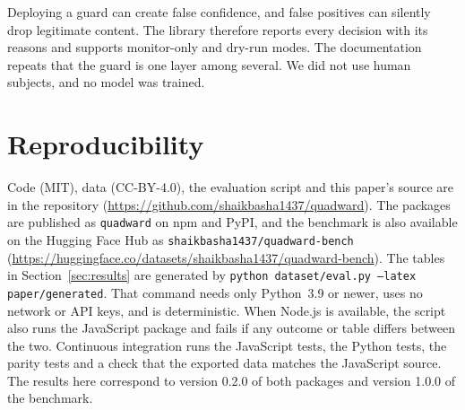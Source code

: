 \documentclass[10pt]{article}
\begin{document}
Deploying a guard can create false confidence, and false positives can silently drop legitimate content. The library therefore reports every decision with its reasons and supports monitor-only and dry-run modes. The documentation repeats that the guard is one layer among several. We did not use human subjects, and no model was trained.

\section{Reproducibility}
Code (MIT), data (CC-BY-4.0), the evaluation script and this paper's source are in the repository (\url{https://github.com/shaikbasha1437/quadward}). The packages are published as \texttt{quadward} on npm and PyPI, and the benchmark is also available on the Hugging Face Hub as \texttt{shaikbasha1437/quadward-bench} (\url{https://huggingface.co/datasets/shaikbasha1437/quadward-bench}). The tables in Section~\ref{sec:results} are generated by \texttt{python dataset/eval.py --latex paper/generated}. That command needs only Python~3.9 or newer, uses no network or API keys, and is deterministic. When Node.js is available, the script also runs the JavaScript package and fails if any outcome or table differs between the two. Continuous integration runs the JavaScript tests, the Python tests, the parity tests and a check that the exported data matches the JavaScript source. The results here correspond to version 0.2.0 of both packages and version 1.0.0 of the benchmark.



\end{document}

